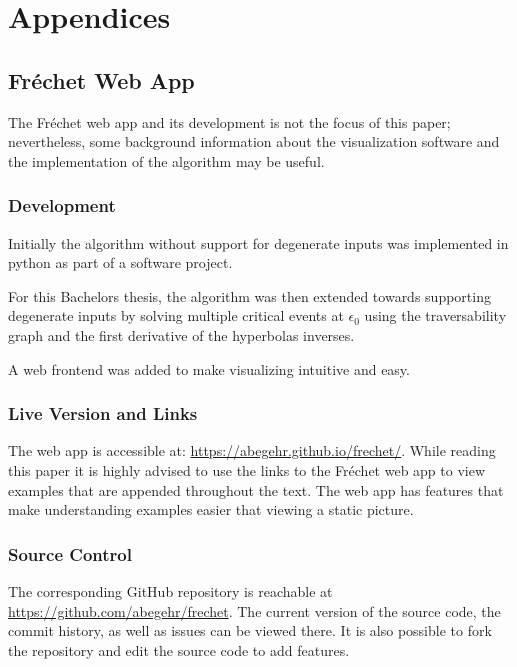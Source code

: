 \appendix

\section{Appendices}

\subsection{Fréchet Web App}

The Fréchet web app and its development is not the focus of this paper; nevertheless, some background information about the visualization software and the implementation of the algorithm may be useful.

\subsubsection{Development}

Initially the algorithm without support for degenerate inputs was implemented in python as part of a software project.\

For this Bachelors thesis, the algorithm was then extended towards supporting degenerate inputs by solving multiple critical events at $\epsilon_0$ using the traversability graph and the first derivative of the hyperbolas inverses.\

A web frontend was added to make visualizing intuitive and easy.

\subsubsection{Live Version and Links}

The web app is accessible at: \url{https://abegehr.github.io/frechet/}. While reading this paper it is highly advised to use the links to the Fréchet web app to view examples that are appended throughout the text. The web app has features that make understanding examples easier that viewing a static picture.\

\subsubsection{Source Control}

The corresponding GitHub repository is reachable at \url{https://github.com/abegehr/frechet}. The current version of the source code, the commit history, as well as issues can be viewed there. It is also possible to fork the repository and edit the source code to add features.


